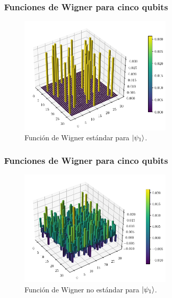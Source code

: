 \documentclass[10pt, spanish]{beamer}
\begin{document}
  \begin{frame}
    \frametitle{Funciones de Wigner para cinco qubits}

    \begin{figure}[h]
      \centering
      \includegraphics[width=0.65\textwidth]{
      imgs/wigner-standard-2-5-s1.png}
      \caption{Función de Wigner estándar para
      $\ket{\psi_1}$.}
      \label{fig:wigner-standard-2-5-s1}
    \end{figure}
  \end{frame}

  \begin{frame}
    \frametitle{Funciones de Wigner para cinco qubits}

    \begin{figure}[h]
      \centering
      \includegraphics[width=0.65\textwidth]{
      imgs/wigner-kantor-2-5-s1.png}
      \caption{Función de Wigner no estándar para
      $\ket{\psi_1}$.}
      \label{fig:wigner-kantor-2-5-s1}
    \end{figure}
  \end{frame}
\end{document}
